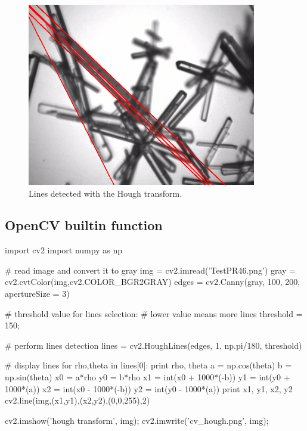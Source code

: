 \begin{figure}
 \centering
 \includegraphics[width=10cm]{cv_hough.png}
 \caption{Lines detected with the Hough transform.}
 \label{fig:hough:python:hough}
\end{figure}


\subsection{OpenCV builtin function}
\begin{python}
import cv2
import numpy as np

# read image and convert it to gray
img = cv2.imread('TestPR46.png')
gray = cv2.cvtColor(img,cv2.COLOR_BGR2GRAY)
edges = cv2.Canny(gray, 100, 200, apertureSize = 3)

# threshold value for lines selection:
# lower value means more lines
threshold = 150;

# perform lines detection
lines = cv2.HoughLines(edges, 1, np.pi/180, threshold)

# display lines
for rho,theta in lines[0]:
    print rho, theta
    a = np.cos(theta)
    b = np.sin(theta)
    x0 = a*rho
    y0 = b*rho
    x1 = int(x0 + 1000*(-b))
    y1 = int(y0 + 1000*(a))
    x2 = int(x0 - 1000*(-b))
    y2 = int(y0 - 1000*(a))
    print x1, y1, x2, y2
    cv2.line(img,(x1,y1),(x2,y2),(0,0,255),2)

cv2.imshow('hough transform', img);
cv2.imwrite('cv_hough.png', img);
\end{python}
